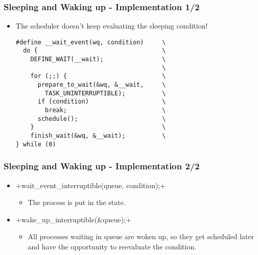 \begin{frame}[fragile]
  \frametitle{Sleeping and Waking up - Implementation 1/2}
  \begin{itemize}
  \item The scheduler doesn't keep evaluating the sleeping condition!
\begin{verbatim}
#define __wait_event(wq, condition)     \
  do {                                  \
    DEFINE_WAIT(__wait);                \
                                        \
    for (;;) {                          \
      prepare_to_wait(&wq, &__wait,     \
        TASK_UNINTERRUPTIBLE);          \
      if (condition)                    \
        break;                          \
      schedule();                       \
    }                                   \
    finish_wait(&wq, &__wait);          \
} while (0)
\end{verbatim}
\end{itemize}
\end{frame}

\begin{frame}[fragile]
  \frametitle{Sleeping and Waking up - Implementation 2/2}
  \begin{itemize}
  \item \mint{c}+wait_event_interruptible(queue, condition);+
    \begin{itemize}
    \item The process is put in the  state.
    \end{itemize}
  \item {}+wake_up_interruptible(&queue);+
    \begin{itemize}
    \item All processes waiting in queue are woken up, so they get
      scheduled later and have the opportunity to reevaluate the
      condition.
    \end{itemize}
  \end{itemize}
\end{frame}
